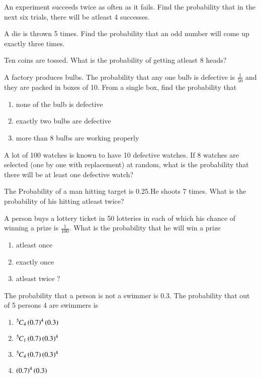 \solution

\item An experiment succeeds twice as often as it fails. Find the probability that in the next
six trials, there will be atleast 4 successes.
\solution
\item A die is thrown 5 times. Find the probability that an odd number will come up exactly three times.
		\solution
\item Ten coins are tossed. What is the probability of getting atleast 8 heads?
\\
\solution 

\item A factory produces bulbs. The probability that any one bulb is defective is $\frac{1}{50}$ and they are packed in boxes of 10. From a single box, find the probability that
\begin{enumerate}
\item none of the bulb is defective 
\item exactly two bulbs are defective 
\item more than 8 bulbs are working properly
\end{enumerate}
\solution

\item A lot of 100 watches is known to have 10 defective watches. If 8 watches are
selected (one by one with replacement) at random, what is the probability that
there will be at least one defective watch?
\item The Probability of a man hitting  target is 0.25.He shoots 7 times. What is the probability of his hitting atleast twice?\\
\item A person buys a lottery ticket in 50 lotteries in each of which his chance of winning a prize is $\frac{1}{100}$. What is the probability that he will win a prize
\begin{enumerate}[label=(\alph*)]
 \item  atleast once 
 \item exactly once 
 \item atleast twice ?
\end{enumerate}

\item The probability that a person is not a swimmer is 0.3. The probability that out of
5 persons 4 are swimmers is
\begin{enumerate}
\item ${{}^{5}\mkern-1muC_{4}}\left(0.7\right)^4\left(0.3\right)$
\item ${{}^{5}\mkern-1muC_{1}}\left(0.7\right)\left(0.3\right)^4$
\item ${{}^{5}\mkern-1muC_{4}}\left(0.7\right)\left(0.3\right)^4$
\item $\left(0.7\right)^4\left(0.3\right)$
\end{enumerate}

